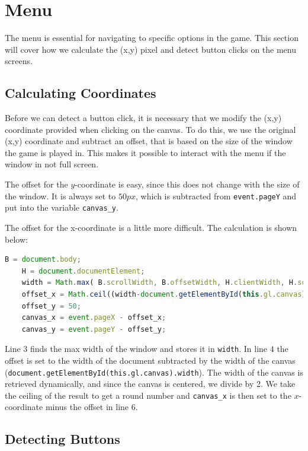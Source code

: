 \section{Menu}
\label{sec:imp_menu}

The menu is essential for navigating to specific options in the game. This section will cover how we calculate the (x,y) pixel and detect button clicks on the menu screens.

\subsection{Calculating Coordinates}

Before we can detect a button click, it is necessary that we modify the (x,y) coordinate provided when clicking on the canvas. To do this, we use the original (x,y) coordinate and subtract an offset, that is based on the size of the window the game is played in. This makes it possible to interact with the menu if the window in not full screen.

The offset for the $y$-coordinate is easy, since this does not change with the size of the window. It is always set to $50px$, which is subtracted from \verb|event.pageY| and put into the variable \verb|canvas_y|.\newline

The offset for the x-coordinate is a little more difficult. The calculation is shown below:

\begin{lstlisting}[language=JavaScript, caption=function: doMouseDown(event)]
	B = document.body;
	H = document.documentElement;
	width = Math.max( B.scrollWidth, B.offsetWidth, H.clientWidth, H.scrollWidth, H.offsetWidth);
	offset_x = Math.ceil((width-document.getElementById(this.gl.canvas).width)/2);
	offset_y = 50;
	canvas_x = event.pageX - offset_x;
	canvas_y = event.pageY - offset_y;
\end{lstlisting}
 
Line $3$ finds the max width of the window and stores it in \verb|width|. In line $4$ the offset is set to the width of the document subtracted by the width of the canvas (\verb|document.getElementById(this.gl.canvas).width|). The width of the canvas is retrieved dynamically, and since the canvas is centered, we divide by 2. We take the ceiling of the result to get a round number and \verb|canvas_x| is then set to the $x$-coordinate minus the offset in line $6$.

\subsection{Detecting Buttons}

